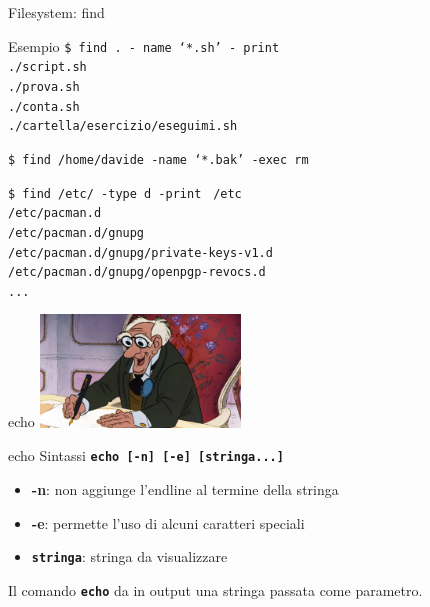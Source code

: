 \documentclass{beamer}
\begin{document}
    \begin{frame}{Filesystem: find}
        \small
        \begin{exampleblock}{Esempio}
            \texttt{\$ find . - name `*.sh' - print \\}
            \texttt{./script.sh \\
            ./prova.sh \\
            ./conta.sh \\
            ./cartella/esercizio/eseguimi.sh}

            \vspace{0.5cm}

            \texttt{\$ find /home/davide -name `*.bak' -exec rm {} \;}
            
            \vspace{0.5cm}

            \texttt{\$ find /etc/ -type d -print}
            \texttt{
                /etc \\
                /etc/pacman.d \\
                /etc/pacman.d/gnupg \\
                /etc/pacman.d/gnupg/private-keys-v1.d \\
                /etc/pacman.d/gnupg/openpgp-revocs.d \\
                ...
            }

        \end{exampleblock}
    \end{frame}

    \begin{frame}{echo}
        \centering
        \includegraphics[height=3cm, keepaspectratio]{images/george.png}

        \begin{block}{echo}
            \small
            Sintassi \texttt{\textbf{echo [-n] [-e] [stringa...]}}

            \begin{itemize}
                \item \textbf{-n}: non aggiunge l'endline al termine della stringa
                \item \textbf{-e}: permette l'uso di alcuni caratteri speciali
                \item \texttt{\textbf{stringa}}: stringa da visualizzare
            \end{itemize}

            Il comando \texttt{\textbf{echo}} da in output una stringa passata come parametro.
        \end{block}

        
    \end{frame}
\end{document}
